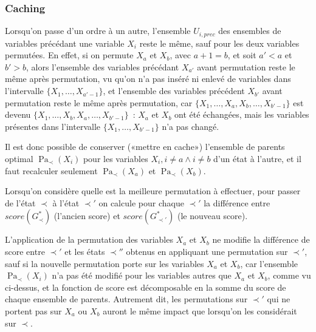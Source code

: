 \documentclass[french,a4paper]{article}
\DeclareMathOperator{\Pa}{Pa}
\begin{document}
\subsubsection{Caching}
\label{sec:caching}

Lorsqu'on passe d'un ordre à un autre, l'ensemble $U_{i,prec}$ des
ensembles de variables précédant une variable $X_i$ reste le même,
sauf pour les deux variables permutées. En effet, si on permute $X_a$
et $X_b$, avec $a + 1 = b$, et soit $a' < a$ et $b' > b$, alors
l'ensemble des variables précédant $X_{a'}$ avant permutation reste le
même après permutation, vu qu'on n'a pas inséré ni enlevé de variables
dans l'intervalle $\{X_1, \dots, X_{a'-1}\}$, et l'ensemble des
variables précédent $X_{b'}$ avant permutation reste le même après
permutation, car $\{X_1, \dots, X_{a}, X_{b}, \dots, X_{b'-1}\}$ est
devenu $\{X_1, \dots, X_{b}, X_{a}, \dots, X_{b'-1}\}$~: $X_a$ et
$X_b$ ont été échangées, mais les variables présentes dans
l'intervalle $\{X_1, \dots, X_{b'-1}\}$ n'a pas changé.

Il est donc possible de conserver («mettre en cache») l'ensemble de
parents optimal $\Pa_\prec(X_i)$ pour les variables $X_i, i \neq a
\wedge i \neq b$ d'un état à l'autre, et il faut recalculer seulement
$\Pa_\prec(X_a)$ et $\Pa_\prec(X_b)$.

Lorsqu'on considère quelle est la meilleure permutation à effectuer,
pour passer de l'état $\prec$ à l'état $\prec'$ on calcule pour chaque
$\prec'$ la différence entre $score(G^*_\prec)$ (l'ancien score) et
$score(G^*_{\prec'})$ (le nouveau score).

L'application de la permutation des variables $X_a$ et $X_b$ ne
modifie la différence de score entre $\prec'$ et les états $\prec''$
obtenus en appliquant une permutation sur $\prec'$, sauf si la
nouvelle permutation porte sur les variables $X_a$ et $X_b$, car
l'ensemble $\Pa_\prec(X_i)$ n'a pas été modifié pour les variables
autres que $X_a$ et $X_b$, comme vu ci-dessus, et la fonction de score
est décomposable en la somme du score de chaque ensemble de
parents. Autrement dit, les permutations sur $\prec'$ qui ne portent
pas sur $X_a$ ou $X_b$ auront le même impact que lorsqu'on les
considérait sur $\prec$.
\end{document}
